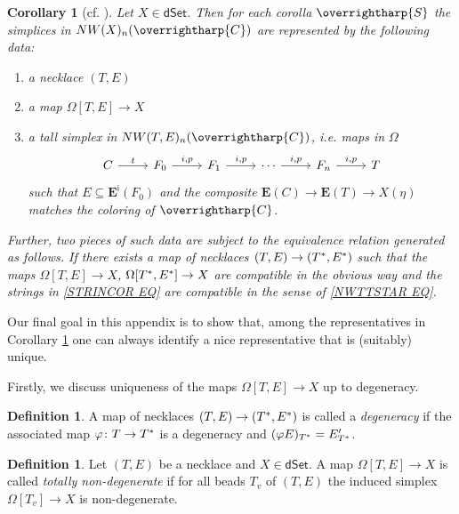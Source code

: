 \documentclass[a4paper,10pt
,draft
]{article}%
\numberwithin{equation}{section}
\numberwithin{figure}{section}
\newtheorem{corollary}[equation]{Corollary}%
\theoremstyle{definition} %
\newtheorem{definition}[equation]{Definition}%
\newcommand{\vect}[1]{\text{\overrightharp{\ensuremath{#1}}}}
\newcommand{\1}{\ensuremath{\mathbbm 1}}%
\begin{document}
\begin{corollary}[{cf. \cite[Cor. 4.8]{DS11}}]
	\label{NWXREPS COR}
	Let $X\in \mathsf{dSet}$.
	Then for each corolla $\vect{S}$ the simplices in 
	$NW(X)_n(\vect{C})$
	are represented by the following data:
	\begin{enumerate}[label=(\roman*)]
		\item a necklace $(T,E)$ 
		\item a map $\Omega[T,E] \to X$
		\item a tall simplex in $NW(T,E)_n(\vect{C})$, i.e. maps in $\Omega$
		\begin{equation}\label{STRINCOR EQ}
		\begin{tikzcd}
		C \ar{r}{t}
		&
		F_0 \ar{r}{i,p}
		&
		F_1 \ar{r}{i,p}
		&
		\cdots
		\ar{r}{i,p}
		&
		F_n \ar{r}{i,p}
		&
		T
		\end{tikzcd}
		\end{equation}
		such that 
		$E \subseteq \boldsymbol{E}^{\mathsf{i}}(F_0)$
		and the composite 
		$\boldsymbol{E}(C) \to \boldsymbol{E}(T) \to X(\eta)$
		matches the coloring of $\vect{C}$.
	\end{enumerate}
	
	Further, two pieces of such data are subject to the equivalence relation generated as follows.  
	If there exists a map of necklaces $(T,E) \to (T^{\**},E^{\**})$
	such that the maps 
	$\Omega[T,E] \to X$,
	$\Omega[T^{\**},E^{\**}] \to X$
	are compatible in the obvious way and the 
	strings in \eqref{STRINCOR EQ}
	are compatible in the sense of 
	\eqref{NWTTSTAR EQ}.
\end{corollary}



Our final goal in this appendix is to show that, 
among the representatives in 
Corollary \ref{NWXREPS COR}
one can always identify a nice representative that is 
(suitably) unique.

Firstly, we discuss uniqueness of 
the maps
$\Omega[T,E] \to X$ up to degeneracy.

\begin{definition}
	A map of necklaces 
	$(T,E) \to (T^{\**},E^{\**})$
	is called a \emph{degeneracy}
	if the associated map
	$\varphi \colon T \to T^{\**}$
	is a degeneracy and
	$(\varphi E)_{T^{\**}} = E'_{T^{\**}}$.
\end{definition}


\begin{definition}
	Let $(T,E)$ be a necklace and $X \in \mathsf{dSet}$.
	A map 
	$\Omega[T,E] \to X$
	is called \emph{totally non-degenerate}
	if for all beads $T_v$ of $(T,E)$
	the induced simplex
	$\Omega[T_v] \to X$
	is non-degenerate.
\end{definition}
\end{document}
